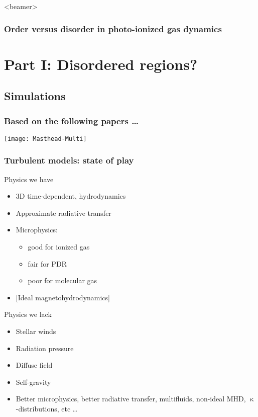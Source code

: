 \documentclass[presentation]{beamer}
\begin{document}
\begin{frame}<beamer>
  \frametitle{Order versus disorder in photo-ionized gas dynamics}
  \tableofcontents[hidesubsections]
\end{frame}

\section{Part I: Disordered \hii{} regions?}
\subsection{Simulations}

\newlength\maxheight
\setlength\maxheight{0.8\textheight}
\newlength\moviewidth
\setlength{}
\newlength\movieheight


\begin{frame}
  \frametitle{Based on the following papers \dots}
  \texttt{[image: Masthead-Multi]}
\end{frame}
\begin{frame}[shrink=5]
\frametitle{Turbulent models: state of play}
\begin{block}{Physics we have}
  \begin{itemize}
  \item 3D time-dependent, hydrodynamics
  \item Approximate radiative transfer
  \item Microphysics:
    \begin{itemize}
    \item good for ionized gas
    \item fair for PDR
    \item poor for molecular gas
    \end{itemize}
  \item {}[Ideal magnetohydrodynamics]
  \end{itemize}
\end{block}
\begin{block}{Physics we lack}
  \begin{itemize}
  \item Stellar winds
  \item Radiation pressure
  \item Diffuse field
  \item Self-gravity
  \item{} 
    {\footnotesize Better microphysics, better radiative transfer,
    \scriptsize multifluids, non-ideal MHD, \tiny \(\upkappa\)-distributions, etc \dots}
  \end{itemize}
\end{block}
\end{frame}
\end{document}
